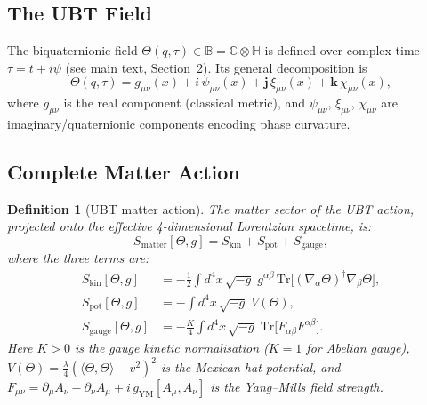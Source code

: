 \documentclass[12pt]{article}
\newtheorem{definition}{Definition}[section]
\newcommand{\B}{\mathbb{B}}
\newcommand{\C}{\mathbb{C}}
\renewcommand{\H}{\mathbb{H}}
\newcommand{\Tr}{\mathrm{Tr}}
\begin{document}
\subsection{The UBT Field}

The biquaternionic field $\Theta(q,\tau) \in \B = \C\otimes\H$ is defined
over complex time $\tau = t + i\psi$ (see main text, Section~2).
Its general decomposition is
\begin{equation}
  \Theta(q,\tau) = g_{\mu\nu}(x) + i\,\psi_{\mu\nu}(x)
                  + \mathbf{j}\,\xi_{\mu\nu}(x) + \mathbf{k}\,\chi_{\mu\nu}(x),
  \label{eq:theta_decomp}
\end{equation}
where $g_{\mu\nu}$ is the real component (classical metric), and
$\psi_{\mu\nu}$, $\xi_{\mu\nu}$, $\chi_{\mu\nu}$ are imaginary/quaternionic
components encoding phase curvature.

\subsection{Complete Matter Action}

\begin{definition}[UBT matter action]
\label{def:action}
The matter sector of the UBT action, projected onto the effective
4-dimensional Lorentzian spacetime, is:
\begin{equation}
  S_{\mathrm{matter}}[\Theta, g]
  = S_{\mathrm{kin}} + S_{\mathrm{pot}} + S_{\mathrm{gauge}},
  \label{eq:S_matter}
\end{equation}
where the three terms are:
\begin{align}
  S_{\mathrm{kin}}[\Theta, g]
    &= -\frac{1}{2}\int d^4x\,\sqrt{-g}\;
       g^{\alpha\beta}\,\Tr\!\bigl[(\nabla_\alpha\Theta)^\dagger
       \nabla_\beta\Theta\bigr],
       \label{eq:S_kin} \\[4pt]
  S_{\mathrm{pot}}[\Theta, g]
    &= -\int d^4x\,\sqrt{-g}\; V(\Theta),
       \label{eq:S_pot} \\[4pt]
  S_{\mathrm{gauge}}[\Theta, g]
    &= -\frac{K}{4}\int d^4x\,\sqrt{-g}\;
       \Tr\!\bigl[F_{\alpha\beta}F^{\alpha\beta}\bigr].
       \label{eq:S_gauge}
\end{align}
Here $K > 0$ is the gauge kinetic normalisation ($K = 1$ for Abelian gauge),
$V(\Theta) = \tfrac{\lambda}{4}(\langle\Theta,\Theta\rangle - v^2)^2$
is the Mexican-hat potential, and $F_{\mu\nu} = \partial_\mu A_\nu - \partial_\nu A_\mu
+ i\,g_{\mathrm{YM}}[A_\mu, A_\nu]$ is the Yang--Mills field strength.
\end{definition}
\end{document}
